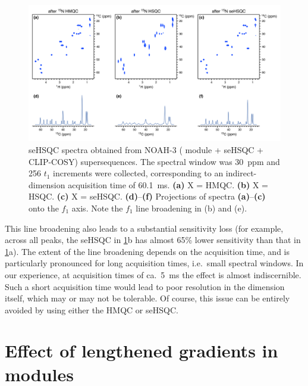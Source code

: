 \begin{figure}
    \centering
    \includegraphics[width=\textwidth]{./figures/n15_linebroadening.png}
    \caption{
        \carbon{} seHSQC spectra obtained from NOAH-3  (\nitrogen{} module + \carbon{} seHSQC + CLIP-COSY) supersequences.
        The \nitrogen{} spectral window was \SI{30}{ppm} and 256 $t_1$ increments were collected, corresponding to an indirect-dimension \nitrogen{} acquisition time of \SI{60.1}{\ms}.
        \textbf{(a)} X = HMQC.
        \textbf{(b)} X = HSQC.
        \textbf{(c)} X = seHSQC.
        \textbf{(d)}--\textbf{(f)} Projections of spectra \textbf{(a)}--\textbf{(c)} onto the $f_1$ axis.
        Note the $f_1$ line broadening in (b) and (e).
        \grami{}
    }
    \label{fig:n15_linebroadening}
\end{figure}

This line broadening also leads to a substantial sensitivity loss (for example, across all peaks, the \carbon{} seHSQC in \cref{fig:n15_linebroadening}b has almost 65\% lower sensitivity than that in \cref{fig:n15_linebroadening}a).
The extent of the line broadening depends on the acquisition time, and is particularly pronounced for long acquisition times, i.e.\ small \nitrogen{} spectral windows.
In our experience, at \nitrogen{} acquisition times of ca.\ \SI{5}{\ms} the effect is almost indiscernible.
Such a short acquisition time would lead to poor resolution in the \nitrogen{} dimension itself, which may or may not be tolerable.
Of course, this issue can be entirely avoided by using either the HMQC or seHSQC.

\section{Effect of lengthened gradients in \texorpdfstring{\nitrogen{}}{15N} modules}

